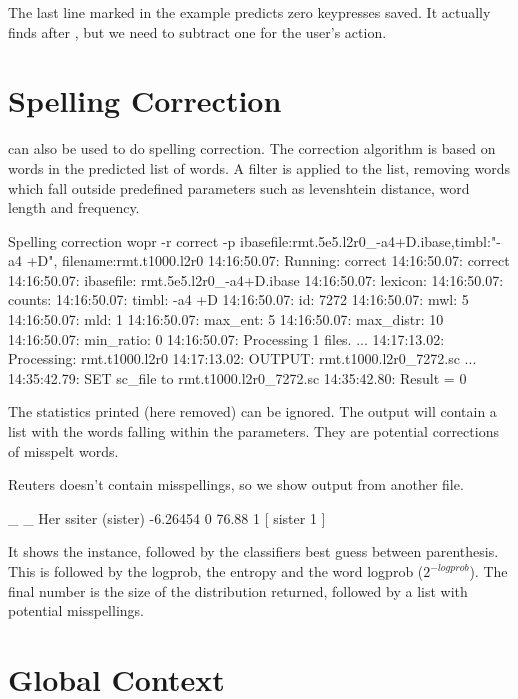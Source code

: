 \documentclass[a4paper,10pt,twoside]{report}
\begin{document}
The last line marked  in the example predicts zero keypresses saved. It
actually finds  after , but we need to subtract one for the
user's  action.

\section{Spelling Correction}

\Wopr{} can also be used to do spelling correction. The correction
algorithm is based on words in the predicted list of words. A filter
is applied to the list, removing words which fall outside predefined
parameters such as levenshtein distance, word length and frequency.

\begin{bash}{Spelling correction}
wopr -r correct -p ibasefile:rmt.5e5.l2r0_-a4+D.ibase,timbl:"-a4 +D",
                   filename:rmt.t1000.l2r0
14:16:50.07: Running: correct
14:16:50.07: correct
14:16:50.07:  ibasefile:  rmt.5e5.l2r0_-a4+D.ibase
14:16:50.07:  lexicon:    
14:16:50.07:  counts:     
14:16:50.07:  timbl:      -a4 +D
14:16:50.07:  id:         7272
14:16:50.07:  mwl:        5
14:16:50.07:  mld:        1
14:16:50.07:  max_ent:    5
14:16:50.07:  max_distr:  10
14:16:50.07:  min_ratio:  0
14:16:50.07: Processing 1 files.
...
14:17:13.02: Processing: rmt.t1000.l2r0
14:17:13.02: OUTPUT:     rmt.t1000.l2r0_7272.sc
...
14:35:42.79:  SET sc_file to rmt.t1000.l2r0_7272.sc
14:35:42.80: Result = 0
\end{bash}

The statistics printed (here removed) can be ignored. The output will
contain a list with the words falling within the parameters. They are
potential corrections of misspelt words.

Reuters doesn't contain misspellings, so we show output from another
file.

\begin{wout}{}
_ _ Her ssiter (sister) -6.26454 0 76.88 1 [ sister 1 ]
\end{wout}

It shows the instance, followed by the classifiers best guess between
parenthesis. This is followed by the logprob, the entropy and the word
logprob ($2^{-logprob}$). The final number is the size of the \Timbl{}
distribution returned, followed by a list with potential misspellings.

\section{Global Context}
\end{document}
